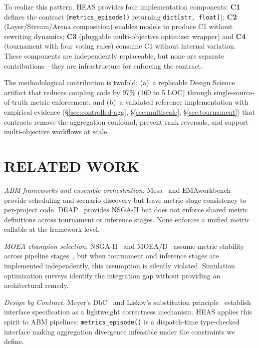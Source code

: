 \documentclass{wscpaperproc}
\begin{document}
To realize this pattern, HEAS provides four implementation components:
\textbf{C1} defines the contract (\texttt{metrics\_episode()} returning
\texttt{dict[str, float]}); \textbf{C2} (Layer/Stream/Arena composition) enables
models to produce C1 without rewriting dynamics; \textbf{C3} (pluggable multi-objective
optimizer wrapper) and \textbf{C4} (tournament with four voting rules) consume C1
without internal variation. These components are independently replaceable, but none
are separate contributions---they are infrastructure for enforcing the contract.

The methodological contribution is twofold: (a)~a replicable Design Science
artifact that reduces coupling code by 97\% (160 to 5 LOC) through
single-source-of-truth metric enforcement; and (b)~a validated reference
implementation with empirical evidence (\S\ref{sec:controlled-agg},
\S\ref{sec:multiscale}, \S\ref{sec:tournament}) that contracts remove the
aggregation confound, prevent rank reversals, and support multi-objective
workflows at scale.

\section{RELATED WORK}

\textit{ABM frameworks and ensemble orchestration.}
Mesa~\cite{kazil2020mesa} and EMAworkbench~\cite{kwakkel2017workbench} provide
scheduling and scenario discovery but leave metric-stage consistency to
per-project code. DEAP~\cite{fortin2012deap} provides NSGA-II but does not
enforce shared metric definitions across tournament or inference stages. None
enforces a unified metric callable at the framework level.

\textit{MOEA champion selection.}
NSGA-II~\cite{deb2002nsga2} and MOEA/D~\cite{zhang2007moead} assume metric
stability across pipeline stages~\cite{fu2002optimization}, but when tournament
and inference stages are implemented independently, this assumption is silently
violated. Simulation optimization surveys identify the integration gap without
providing an architectural remedy.

\textit{Design by Contract.}
Meyer's DbC~\cite{meyer1997object} and Liskov's substitution
principle~\cite{liskov1994behavioral} establish interface specification as a
lightweight correctness mechanism. HEAS applies this spirit to ABM pipelines:
\texttt{metrics\_episode()} is a dispatch-time type-checked interface making
aggregation divergence infeasible under the constraints we define.
\end{document}
